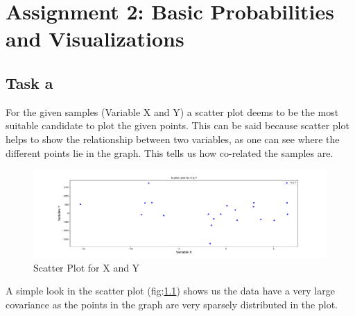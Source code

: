 \chapter{Assignment 2: Basic Probabilities and Visualizations}

\section{Task a}
For the given samples (Variable X and Y) a scatter plot deems to be the most suitable candidate to plot the given points. This can be said because scatter plot helps to show the relationship between two variables, as one can see where the different points lie in the graph. This tells us how co-related the samples are.

\begin{figure}[h!]
\centering
\includegraphics[width=\textwidth]{pics/task_2_a.pdf}
\caption{Scatter Plot for X and Y}\label{fig:task_2_a}
\end{figure}
\FloatBarrier
\newline A simple look in the scatter plot (fig:\ref{fig:task_2_a}) shows us the data have a very large covariance as the points in the graph are very sparsely distributed in the plot.

